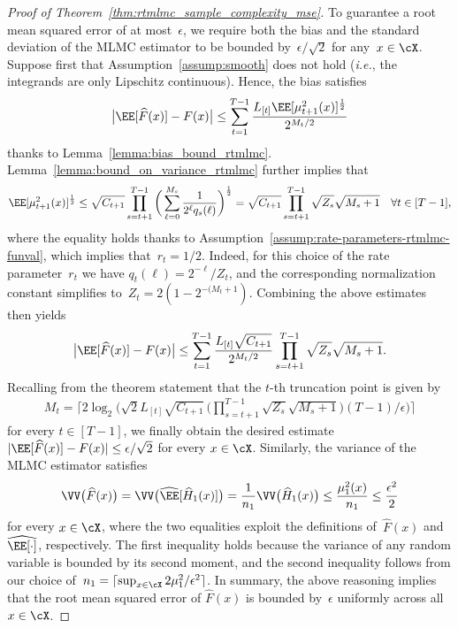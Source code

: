 \documentclass[11pt]{article}
\let\hat\widehat
\begin{document}
\begin{proof}[Proof of Theorem~\ref{thm:rtmlmc_sample_complexity_mse}]
To guarantee a root mean squared error of at most~$\epsilon$, we require both the bias and the standard deviation of the MLMC estimator to be bounded by~$\epsilon/\sqrt{2}$ for any~$x\in\cX$. Suppose first that Assumption~\ref{assump:smooth} does not hold ({\em i.e.}, the integrands are only Lipschitz continuous). Hence, the bias satisfies
\begin{align*}
  \big|\EE[\hat{F}(x)] - F(x)\big| \leq \sum_{t=1}^{T-1}\frac{L_{[t]}\EE[\mu_{t+1}^2(x)]^\frac{1}{2}}{2^{M_t/2}} 
\end{align*}
thanks to Lemma~\ref{lemma:bias_bound_rtmlmc}. Lemma~\ref{lemma:bound_on_variance_rtmlmc} further implies that
\[
    \EE[\mu_{t+1}^2(x)]^\frac{1}{2} \leq \sqrt{C_{t+1}} \prod_{s=t+1}^{T-1} \bigg( \sum_{\ell=0}^{M_s}\frac{1}{2^{\ell} q_s(\ell)} \bigg)^{\frac{1}{2}} = \sqrt{C_{t+1}} \prod_{s=t+1}^{T-1} \sqrt{Z_s} \sqrt{M_s+1} \quad \forall t\in[T-1],
\]
where the equality holds thanks to Assumption~\ref{assump:rate-parameters-rtmlmc-funval}, which implies that~$r_t=1/2$. Indeed, for this choice of the rate parameter~$r_t$ we have $q_t(\ell) = 2^{-\ell}/Z_t$, and the corresponding normalization constant simplifies to~$Z_t=2(1-2^{-(M_t+1})$. Combining the above estimates then yields
\begin{align*}
  \big|\EE[\hat{F}(x)] - F(x)\big| \leq \sum_{t=1}^{T-1} \frac{L_{[t]} \sqrt{C_{t+1}}}{2^{M_t/2}} \prod_{s=t+1}^{T-1} \sqrt{Z_s} \sqrt{M_s+1}.
\end{align*}
Recalling from the theorem statement that the $t$-th truncation point is given by
\begin{align*}
     M_{t} = \bigg\lceil 2\log_2\Big( \textstyle \sqrt{2}L_{[t]}\sqrt{C_{t+1}} \, \Big( \prod_{s=t+1}^{T-1} \sqrt{Z_s} \sqrt{M_s+1} \Big) (T-1)/\epsilon \Big) \bigg\rceil
\end{align*}
for every $t \in [T-1]$, we finally obtain the desired estimate $|\EE[\hat{F}(x)] - F(x)| \leq \epsilon/\sqrt{2}$ for every $x\in\cX$. Similarly, the variance of the MLMC estimator satisfies
\[
    \VV\big(\hat{F}(x) \big) = \VV\big(\hat{\EE}[\hat{H}_{1}(x)]\big) = \frac{1}{n_1}\VV\big(\hat{H}_{1}(x)\big) \leq \frac{\mu_1^2(x)}{n_1}\leq \frac{\epsilon^2}{2}
\]
for every $x\in\cX$, where the two equalities exploit the definitions of~$\hat F(x)$ and $\hat \EE[\cdot]$, respectively. The first inequality holds because the variance of any random variable is bounded by its second moment, and the second inequality follows from our choice of~$n_1=\lceil \sup_{x\in\cX} 2\mu_1^2/\epsilon^2 \rceil$. In summary, the above reasoning implies that the root mean squared error of $\hat F(x)$ is bounded by~$\epsilon$ uniformly across all~$x\in\cX$.


\end{proof}
\end{document}
